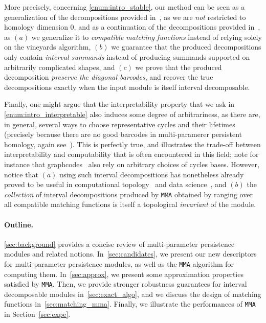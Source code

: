 \documentclass{article}
\newcommand{\MMA}{\texttt{MMA}}
\newcommand{\rebuttal}[1]{{ #1}}
\begin{document}
More precisely, concerning \ref{enum:intro_stable}, our method can be seen as a
generalization of the decompositions provided
in~\cite{caiElderRuleStaircodesAugmentedMetric2021}, as we are {\em not}
restricted to homology dimension $0$, and as a continuation of the
decompositions provided in~\cite{carriereMultiparameterPersistenceImage2020},
as $(a)$ we generalize it to {\em compatible matching functions} instead of
relying solely on the vineyards algorithm, $(b)$ we guarantee that the produced
decompositions only contain {\em interval summands} instead of producing
summands supported on arbitrarily complicated shapes, and $(c)$ we prove that
the produced decomposition {\em preserve the diagonal barcodes}, and recover
the true decompositions exactly when the input module is itself interval
decomposable. 

Finally, one might argue that the interpretability property that we ask in
\ref{enum:intro_interpretable} also induces some degree of arbitrariness, as
there are, in general, several ways to choose representative cycles and their
lifetimes (precisely because there are no good barcodes in multi-paramerer
persistent homology, again see~\cite[Section
10.2.3]{lesnickNotesMultiparameterPersistence2023}). This is perfectly true,
and illustrates the trade-off between interpretability and computability that
is often encountered in this field; note for instance that
graphcodes~\cite{russoldGraphcodeLearningMultiparameter2024,
kerberRepresentingTwoparameterPersistence2025} also rely on arbitrary choices
of cycles bases. However, notice that $(a)$ using such interval decompositions
has nonetheless already proved to be useful in computational
topology~\cite{blaserCoreBifiltration2025} and data
science~\cite{loiseauxFrameworkFastStable2023}, and $(b)$ 
the {\em collection} of interval decompositions produced by \MMA{}
obtained by ranging over all compatible matching functions is itself a
topological {\em invariant} of the module. %
 \\ 











\paragraph*{Outline.} \rebuttal{ \cref{sec:background} provides a concise review of multi-parameter persistence modules and related notions. In~\cref{sec:candidates}, we present our new descriptors for multi-parameter persistence modules, as well as the \MMA{} algorithm for computing them. In~\cref{sec:approx}, we present some approximation properties satisfied by \MMA{}. Then, we provide stronger robustness guarantees for interval decomposable modules in~\cref{sec:exact_algo}, and we discuss the design of matching functions in~\cref{sec:matching_mma}.}
Finally, we illustrate the performances of \MMA{} in Section~\ref{sec:expe}.
\end{document}
